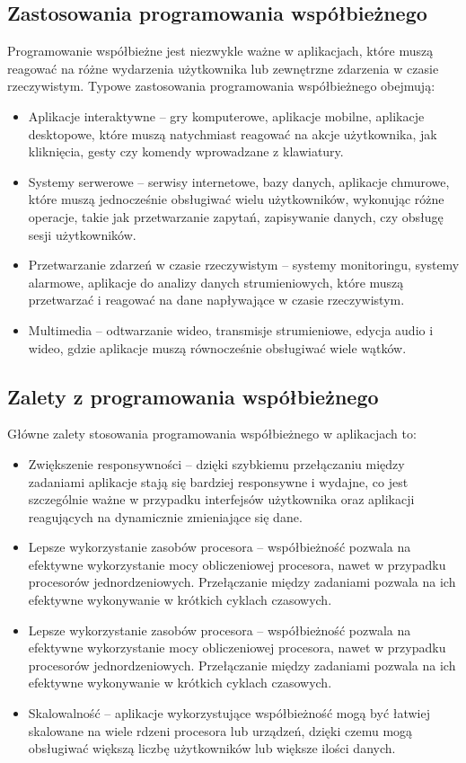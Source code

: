 \subsection{Zastosowania programowania współbieżnego}
Programowanie współbieżne jest niezwykle ważne w aplikacjach, które muszą reagować na różne wydarzenia użytkownika lub zewnętrzne zdarzenia w czasie rzeczywistym. Typowe zastosowania programowania współbieżnego obejmują:
\begin{itemize}
    \item Aplikacje interaktywne – gry komputerowe, aplikacje mobilne, aplikacje desktopowe, które muszą natychmiast reagować na akcje użytkownika, jak kliknięcia, gesty czy komendy wprowadzane z klawiatury.
    \item Systemy serwerowe – serwisy internetowe, bazy danych, aplikacje chmurowe, które muszą jednocześnie obsługiwać wielu użytkowników, wykonując różne operacje, takie jak przetwarzanie zapytań, zapisywanie danych, czy obsługę sesji użytkowników.
    \item Przetwarzanie zdarzeń w czasie rzeczywistym – systemy monitoringu, systemy alarmowe, aplikacje do analizy danych strumieniowych, które muszą przetwarzać i reagować na dane napływające w czasie rzeczywistym.
    \item Multimedia – odtwarzanie wideo, transmisje strumieniowe, edycja audio i wideo, gdzie aplikacje muszą równocześnie obsługiwać wiele wątków.
\end{itemize}


\subsection{Zalety z programowania współbieżnego}
Główne zalety stosowania programowania współbieżnego w aplikacjach to:
\begin{itemize}
    \item Zwiększenie responsywności – dzięki szybkiemu przełączaniu między zadaniami aplikacje stają się bardziej responsywne i wydajne, co jest szczególnie ważne w przypadku interfejsów użytkownika oraz aplikacji reagujących na dynamicznie zmieniające się dane.
    \item Lepsze wykorzystanie zasobów procesora – współbieżność pozwala na efektywne wykorzystanie mocy obliczeniowej procesora, nawet w przypadku procesorów jednordzeniowych. Przełączanie między zadaniami pozwala na ich efektywne wykonywanie w krótkich cyklach czasowych.
    \item Lepsze wykorzystanie zasobów procesora – współbieżność pozwala na efektywne wykorzystanie mocy obliczeniowej procesora, nawet w przypadku procesorów jednordzeniowych. Przełączanie między zadaniami pozwala na ich efektywne wykonywanie w krótkich cyklach czasowych.
    \item Skalowalność – aplikacje wykorzystujące współbieżność mogą być łatwiej skalowane na wiele rdzeni procesora lub urządzeń, dzięki czemu mogą obsługiwać większą liczbę użytkowników lub większe ilości danych.
\end{itemize}

